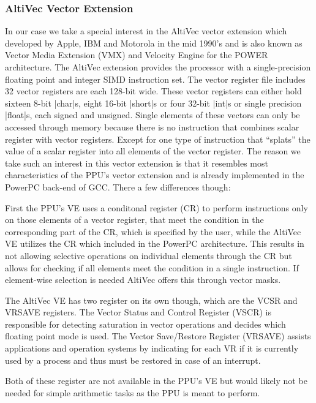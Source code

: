 \subsubsection{AltiVec Vector Extension}
In our case we take a special interest in the AltiVec vector extension which developed by Apple, IBM and Motorola in the mid 1990's and is also known as Vector Media Extension (VMX) and Velocity Engine for the POWER architecture. 
The AltiVec extension provides the processor with a single-precision floating point and integer SIMD instruction set.
The vector register file includes 32 vector registers are each 128-bit wide. \cite{AV:registers}
These vector registers can either hold sixteen 8-bit |char|s, eight 16-bit |short|s or four 32-bit |int|s or single precision |float|s, each signed and unsigned.
Single elements of these vectors can only be accessed through memory because there is no instruction that combines scalar register with vector registers.
Except for one type of instruction that ``splats'' the value of a scalar register into all elements of the vector register.
The reason we take such an interest in this vector extension is that it resembles most characteristics of the PPU's vector extension and is already implemented in the PowerPC back-end of GCC.
There a few differences though:
\begin{addmargin}[2em]{0em}
    First the PPU's VE uses a conditonal register (CR) to perform instructions only on those elements of a vector register, that meet the condition in the corresponding part of the CR, which is specified by the user, while the AltiVec VE utilizes the CR which included in the PowerPC architecture.
    This results in not allowing selective operations on individual elements through the CR but allows for checking if all elements meet the condition in a single instruction.
    If element-wise selection is needed AltiVec offers this through vector masks.
    
    The AltiVec VE has two register on its own though, which are the VCSR and VRSAVE registers.
            The Vector Status and Control Register (VSCR) is responsible for detecting saturation in vector operations and decides which floating point mode is used.
            The Vector Save/Restore Register (VRSAVE) assists applications and operation systems by indicating for each VR if it is currently used by a process and thus must be restored in case of an interrupt.
    
    Both of these register are not available in the PPU's VE but would likely not be needed for simple arithmetic tasks as the PPU is meant to perform.
\end{addmargin}



